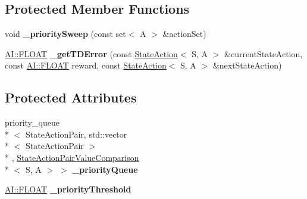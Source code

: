 \subsection*{Protected Member Functions}
\begin{DoxyCompactItemize}
\item 
\hypertarget{classAI_1_1Algorithm_1_1DynaQPrioritizeSweeping_a328421d2cc8ad26641b7786a5ca8b640}{void {\bfseries \-\_\-priority\-Sweep} (const set$<$ A $>$ \&action\-Set)}\label{classAI_1_1Algorithm_1_1DynaQPrioritizeSweeping_a328421d2cc8ad26641b7786a5ca8b640}

\item 
\hypertarget{classAI_1_1Algorithm_1_1DynaQPrioritizeSweeping_a9f69f4ed43b2d9bdb446241fffbb20d7}{\hyperlink{namespaceAI_a41b74884a20833db653dded3918e05c3}{A\-I\-::\-F\-L\-O\-A\-T} {\bfseries \-\_\-get\-T\-D\-Error} (const \hyperlink{classAI_1_1StateAction}{State\-Action}$<$ S, A $>$ \&current\-State\-Action, const \hyperlink{namespaceAI_a41b74884a20833db653dded3918e05c3}{A\-I\-::\-F\-L\-O\-A\-T} reward, const \hyperlink{classAI_1_1StateAction}{State\-Action}$<$ S, A $>$ \&next\-State\-Action)}\label{classAI_1_1Algorithm_1_1DynaQPrioritizeSweeping_a9f69f4ed43b2d9bdb446241fffbb20d7}

\end{DoxyCompactItemize}
\subsection*{Protected Attributes}
\begin{DoxyCompactItemize}
\item 
\hypertarget{classAI_1_1Algorithm_1_1DynaQPrioritizeSweeping_aceb5ef5c47db0d322b4e03ec2c457d1a}{priority\-\_\-queue\\*
$<$ State\-Action\-Pair, std\-::vector\\*
$<$ State\-Action\-Pair $>$\\*
, \hyperlink{classAI_1_1StateActionPairValueComparison}{State\-Action\-Pair\-Value\-Comparison}\\*
$<$ S, A $>$ $>$ {\bfseries \-\_\-priority\-Queue}}\label{classAI_1_1Algorithm_1_1DynaQPrioritizeSweeping_aceb5ef5c47db0d322b4e03ec2c457d1a}

\item 
\hypertarget{classAI_1_1Algorithm_1_1DynaQPrioritizeSweeping_adc3809217aba2de41fbea2b9fb9e5648}{\hyperlink{namespaceAI_a41b74884a20833db653dded3918e05c3}{A\-I\-::\-F\-L\-O\-A\-T} {\bfseries \-\_\-priority\-Threshold}}\label{classAI_1_1Algorithm_1_1DynaQPrioritizeSweeping_adc3809217aba2de41fbea2b9fb9e5648}

\end{DoxyCompactItemize}
